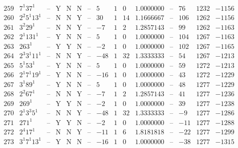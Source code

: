 \documentclass[11pt,reqno,a4letter]{article}
\numberwithin{figure}{section}
\numberwithin{table}{section}
\theoremstyle{plain}
\numberwithin{theorem}{section}
\theoremstyle{definition}
\begin{document}
\begin{table}[h!]
\begin{equation*}
{\begin{array}{|cc|c|ccc|c|c|ccc|c|ccc}
 259 & 7^1 37^1 & \text{--} & \text{Y} & \text{N} & \text{N} & \text{--} & 5 & 1 & 0 & 1.0000000 & \text{--} & 76 & 1232 & -1156 \\
 260 & 2^2 5^1 13^1 & \text{--} & \text{N} & \text{N} & \text{Y} & \text{--} & 30 & 1 & 14 & 1.1666667 & \text{--} & 106 & 1262 & -1156 \\
 261 & 3^2 29^1 & \text{--} & \text{N} & \text{N} & \text{Y} & \text{--} & -7 & 1 & 2 & 1.2857143 & \text{--} & 99 & 1262 & -1163 \\
 262 & 2^1 131^1 & \text{--} & \text{Y} & \text{N} & \text{N} & \text{--} & 5 & 1 & 0 & 1.0000000 & \text{--} & 104 & 1267 & -1163 \\
 263 & 263^1 & \text{--} & \text{Y} & \text{Y} & \text{N} & \text{--} & -2 & 1 & 0 & 1.0000000 & \text{--} & 102 & 1267 & -1165 \\
 264 & 2^3 3^1 11^1 & \text{--} & \text{N} & \text{N} & \text{Y} & \text{--} & -48 & 1 & 32 & 1.3333333 & \text{--} & 54 & 1267 & -1213 \\
 265 & 5^1 53^1 & \text{--} & \text{Y} & \text{N} & \text{N} & \text{--} & 5 & 1 & 0 & 1.0000000 & \text{--} & 59 & 1272 & -1213 \\
 266 & 2^1 7^1 19^1 & \text{--} & \text{Y} & \text{N} & \text{N} & \text{--} & -16 & 1 & 0 & 1.0000000 & \text{--} & 43 & 1272 & -1229 \\
 267 & 3^1 89^1 & \text{--} & \text{Y} & \text{N} & \text{N} & \text{--} & 5 & 1 & 0 & 1.0000000 & \text{--} & 48 & 1277 & -1229 \\
 268 & 2^2 67^1 & \text{--} & \text{N} & \text{N} & \text{Y} & \text{--} & -7 & 1 & 2 & 1.2857143 & \text{--} & 41 & 1277 & -1236 \\
 269 & 269^1 & \text{--} & \text{Y} & \text{Y} & \text{N} & \text{--} & -2 & 1 & 0 & 1.0000000 & \text{--} & 39 & 1277 & -1238 \\
 270 & 2^1 3^3 5^1 & \text{--} & \text{N} & \text{N} & \text{Y} & \text{--} & -48 & 1 & 32 & 1.3333333 & \text{--} & -9 & 1277 & -1286 \\
 271 & 271^1 & \text{--} & \text{Y} & \text{Y} & \text{N} & \text{--} & -2 & 1 & 0 & 1.0000000 & \text{--} & -11 & 1277 & -1288 \\
 272 & 2^4 17^1 & \text{--} & \text{N} & \text{N} & \text{Y} & \text{--} & -11 & 1 & 6 & 1.8181818 & \text{--} & -22 & 1277 & -1299 \\
 273 & 3^1 7^1 13^1 & \text{--} & \text{Y} & \text{N} & \text{N} & \text{--} & -16 & 1 & 0 & 1.0000000 & \text{--} & -38 & 1277 & -1315 \\

\end{array}}
\end{equation*}
\end{table}
\end{document}
